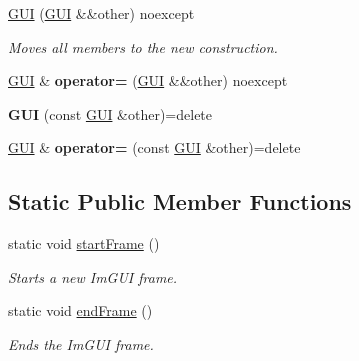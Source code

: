 \textbf{ }\par
\begin{DoxyCompactItemize}
\item 
\hyperlink{classblaze_1_1GUI_ae5c00772ef74fcee43be1aa3b9dc21b1}{G\+UI} (\hyperlink{classblaze_1_1GUI}{G\+UI} \&\&other) noexcept
\begin{DoxyCompactList}\small\item\em Moves all members to the new construction. \end{DoxyCompactList}\item 
\mbox{\label{classblaze_1_1GUI_a53565ce8d39b4d0c3d5980dfb826adfe}} 
\hyperlink{classblaze_1_1GUI}{G\+UI} \& {\bfseries operator=} (\hyperlink{classblaze_1_1GUI}{G\+UI} \&\&other) noexcept
\item 
\mbox{\label{classblaze_1_1GUI_a7ad273a13e32546c610eeb13c23f4c1a}} 
{\bfseries G\+UI} (const \hyperlink{classblaze_1_1GUI}{G\+UI} \&other)=delete
\item 
\mbox{\label{classblaze_1_1GUI_adbfd2f7704fdfe149e5d177e95d42992}} 
\hyperlink{classblaze_1_1GUI}{G\+UI} \& {\bfseries operator=} (const \hyperlink{classblaze_1_1GUI}{G\+UI} \&other)=delete
\end{DoxyCompactItemize}

\subsection*{Static Public Member Functions}
\begin{DoxyCompactItemize}
\item 
\mbox{\label{classblaze_1_1GUI_a8fd65db3d20f30f7a20f90da7b80fa6b}} 
static void \hyperlink{classblaze_1_1GUI_a8fd65db3d20f30f7a20f90da7b80fa6b}{start\+Frame} ()
\begin{DoxyCompactList}\small\item\em Starts a new Im\+G\+UI frame. \end{DoxyCompactList}\item 
\mbox{\label{classblaze_1_1GUI_ac125797f77d684e9e7254588ae14e659}} 
static void \hyperlink{classblaze_1_1GUI_ac125797f77d684e9e7254588ae14e659}{end\+Frame} ()
\begin{DoxyCompactList}\small\item\em Ends the Im\+G\+UI frame. \end{DoxyCompactList}\end{DoxyCompactItemize}


